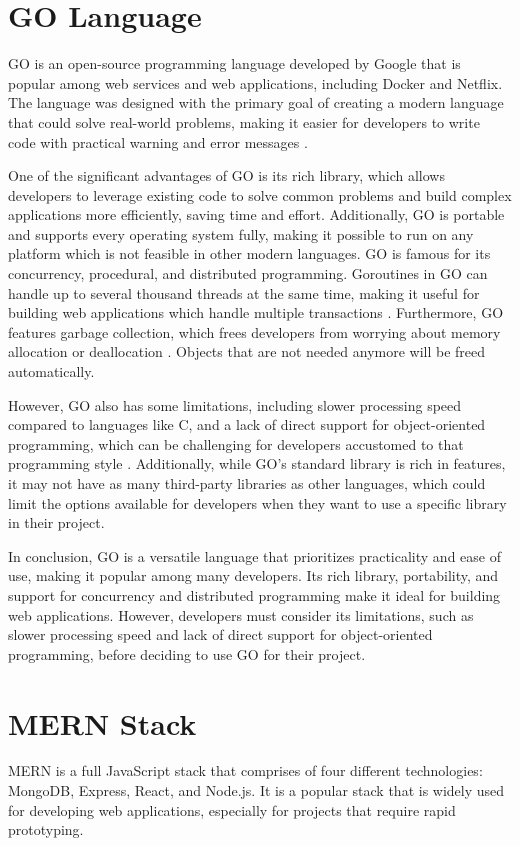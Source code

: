 \section{GO Language}
GO is an open-source programming language developed by Google that is popular among web services and web applications, including Docker and Netflix. The language was designed with the primary goal of creating a modern language that could solve real-world problems, making it easier for developers to write code with practical warning and error messages \cite{mihalis}. 

One of the significant advantages of GO is its rich library, which allows developers to leverage existing code to solve common problems and build complex applications more efficiently, saving time and effort. Additionally, GO is portable and supports every operating system fully, making it possible to run on any platform which is not feasible in other modern languages\cite{andrew}. GO is famous for its concurrency, procedural, and distributed programming. Goroutines in GO can handle up to several thousand threads at the same time, making it useful for building web applications which handle multiple transactions  \cite{andrew, cgptt}. Furthermore, GO features garbage collection, which frees developers from worrying about memory allocation or deallocation \cite{andrew}. Objects that are not needed anymore will be freed automatically.

However, GO also has some limitations, including slower processing speed compared to languages like C, and a lack of direct support for object-oriented programming, which can be challenging for developers accustomed to that programming style \cite{mihalis}. Additionally, while GO's standard library is rich in features, it may not have as many third-party libraries as other languages, which could limit the options available for developers when they want to use a specific library in their project. 

In conclusion, GO is a versatile language that prioritizes practicality and ease of use, making it popular among many developers. Its rich library, portability, and support for concurrency and distributed programming make it ideal for building web applications. However, developers must consider its limitations, such as slower processing speed and lack of direct support for object-oriented programming, before deciding to use GO for their project.

\section{MERN Stack}
MERN is a full JavaScript stack that comprises of four different technologies: MongoDB, Express, React, and Node.js. It is a popular stack that is widely used for developing web applications, especially for projects that require rapid prototyping.

